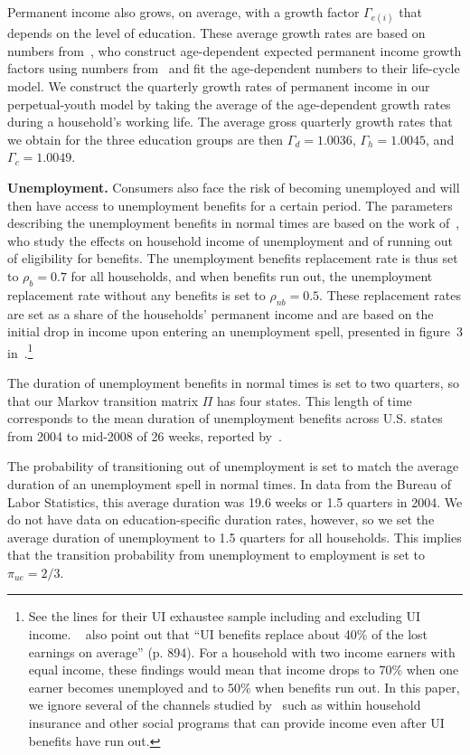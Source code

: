 \documentclass[\latexroot/\projectname]{subfiles}
\begin{document}
Permanent income also grows, on average, with a growth factor $\Gamma_{e(i)}$ that depends on the level of education.
These average growth rates are based on numbers from~\cite{carroll2020modeling}, who construct age-dependent expected permanent income growth factors using numbers from~\cite{cagetti2003wealth} and fit the age-dependent numbers to their life-cycle model.
We construct the quarterly growth rates of permanent income in our perpetual-youth model by taking the average of the age-dependent growth rates during a household's working life.
The average gross quarterly growth rates that we obtain for the three education groups are then $\Gamma_d=1.0036$, $\Gamma_h=1.0045$, and $\Gamma_c=1.0049$.

\textbf{Unemployment.} Consumers also face the risk of becoming unemployed and will then have access to unemployment benefits for a certain period.
The parameters describing the unemployment benefits in normal times are based on the work of~\cite{rothstein2017scraping}, who study the effects on household income of unemployment and of running out of eligibility for benefits.
The unemployment benefits replacement rate is thus set to $\rho_b=0.7$ for all households, and when benefits run out, the unemployment replacement rate without any benefits is set to $\rho_{nb}=0.5$.
These replacement rates are set as a share of the households' permanent income and are based on the initial drop in income upon entering an unemployment spell, presented in figure~3 in~\cite{rothstein2017scraping}.\footnote{See the lines for their UI exhaustee sample including and excluding UI income.
  ~\cite{rothstein2017scraping} also point out that ``UI benefits replace about 40\% of the lost earnings on average'' (p. 894).
  For a household with two income earners with equal income, these findings would mean that income drops to 70\% when one earner becomes unemployed and to 50\% when benefits run out.
  In this paper, we ignore several of the channels studied by~\cite{rothstein2017scraping} such as within household insurance and other social programs that can provide income even after UI benefits have run out.}

The duration of unemployment benefits in normal times is set to two quarters, so that our Markov transition matrix $\Pi$ has four states.
This length of time corresponds to the mean duration of unemployment benefits across U.S.
states from 2004 to mid-2008 of 26 weeks, reported by~\cite{rothstein2017scraping}.

The probability of transitioning out of unemployment is set to match the average duration of an unemployment spell in normal times.
In data from the Bureau of Labor Statistics, this average duration was 19.6 weeks or 1.5 quarters in 2004. We do not have data on  education-specific duration rates, however, so we set the average duration of unemployment to 1.5 quarters for all households. This implies that the transition probability from unemployment to employment is set to $\pi_{ue}=2/3$.
\end{document}
